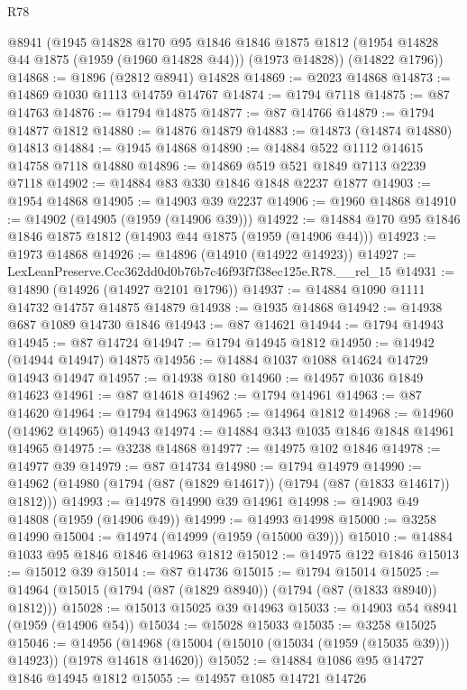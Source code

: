 \begin{lexlean}{R78}
\begin{coremodule}
      @8941
      (@1945
        @14828
        @170
        @95
        @1846
        @1846
        @1875
        @1812
        (@1954 @14828 @44 @1875 (@1959 (@1960 @14828 @44)))
        (@1973 @14828))
      (@14822 @1796))
@14868 := @1896 (@2812 @8941) @14828
@14869 := @2023 @14868
@14873 := @14869 @1030 @1113 @14759 @14767
@14874 := @1794 @7118
@14875 := @87 @14763
@14876 := @1794 @14875
@14877 := @87 @14766
@14879 := @1794 @14877 @1812
@14880 := @14876 @14879
@14883 := @14873 (@14874 @14880) @14813
@14884 := @1945 @14868
@14890 := @14884 @522 @1112 @14615 @14758 @7118 @14880
@14896 := @14869 @519 @521 @1849 @7113 @2239 @7118
@14902 := @14884 @83 @330 @1846 @1848 @2237 @1877
@14903 := @1954 @14868
@14905 := @14903 @39 @2237
@14906 := @1960 @14868
@14910 := @14902 (@14905 (@1959 (@14906 @39)))
@14922 := @14884 @170 @95 @1846 @1846 @1875 @1812 (@14903 @44 @1875 (@1959 (@14906 @44)))
@14923 := @1973 @14868
@14926 := @14896 (@14910 (@14922 @14923))
@14927 := LexLeanPreserve.Ccc362dd0d0b76b7c46f93f7f38ec125e.R78.__rel_15
@14931 := @14890 (@14926 (@14927 @2101 @1796))
@14937 := @14884 @1090 @1111 @14732 @14757 @14875 @14879
@14938 := @1935 @14868
@14942 := @14938 @687 @1089 @14730 @1846
@14943 := @87 @14621
@14944 := @1794 @14943
@14945 := @87 @14724
@14947 := @1794 @14945 @1812
@14950 := @14942 (@14944 @14947) @14875
@14956 := @14884 @1037 @1088 @14624 @14729 @14943 @14947
@14957 := @14938 @180
@14960 := @14957 @1036 @1849 @14623
@14961 := @87 @14618
@14962 := @1794 @14961
@14963 := @87 @14620
@14964 := @1794 @14963
@14965 := @14964 @1812
@14968 := @14960 (@14962 @14965) @14943
@14974 := @14884 @343 @1035 @1846 @1848 @14961 @14965
@14975 := @3238 @14868
@14977 := @14975 @102 @1846
@14978 := @14977 @39
@14979 := @87 @14734
@14980 := @1794 @14979
@14990 := @14962 (@14980 (@1794 (@87 (@1829 @14617)) (@1794 (@87 (@1833 @14617)) @1812)))
@14993 := @14978 @14990 @39 @14961
@14998 := @14903 @49 @14808 (@1959 (@14906 @49))
@14999 := @14993 @14998
@15000 := @3258 @14990
@15004 := @14974 (@14999 (@1959 (@15000 @39)))
@15010 := @14884 @1033 @95 @1846 @1846 @14963 @1812
@15012 := @14975 @122 @1846
@15013 := @15012 @39
@15014 := @87 @14736
@15015 := @1794 @15014
@15025 := @14964 (@15015 (@1794 (@87 (@1829 @8940)) (@1794 (@87 (@1833 @8940)) @1812)))
@15028 := @15013 @15025 @39 @14963
@15033 := @14903 @54 @8941 (@1959 (@14906 @54))
@15034 := @15028 @15033
@15035 := @3258 @15025
@15046 := @14956
    (@14968 (@15004 (@15010 (@15034 (@1959 (@15035 @39))) @14923)) (@1978 @14618 @14620))
@15052 := @14884 @1086 @95 @14727 @1846 @14945 @1812
@15055 := @14957 @1085 @14721 @14726

\end{coremodule}
\end{lexlean}
